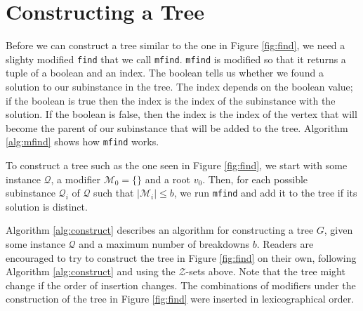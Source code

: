 \section{Constructing a Tree}
\label{sec:construction}
Before we can construct a tree similar to the one in Figure \ref{fig:find},
we need a slighty modified \texttt{find} that we call \texttt{mfind}.
\texttt{mfind} is modified so that it returns a tuple of a boolean and an
index.
The boolean tells us whether we found a solution to our subinstance in the
tree.
The index depends on the boolean value; if the boolean is true then the index
is the index of the subinstance with the solution.
If the boolean is false, then the index is the index of the vertex that will
become the parent of our subinstance that will be added to the tree.
Algorithm \ref{alg:mfind} shows how \texttt{mfind} works.


To construct a tree such as the one seen in Figure \ref{fig:find}, we start
with some instance $\mathcal{Q}$, a modifier $\mathcal{M}_0 = \{ {} \}$ and
a root $v_0$.
Then, for each possible subinstance $\mathcal{Q}_i$ of $\mathcal{Q}$ such that
$|\mathcal{M}_i| \leq b$, we run \texttt{mfind} and add it to the tree if its
solution is distinct.


Algorithm \ref{alg:construct} describes an algorithm for constructing a tree
$G$, given some instance $\mathcal{Q}$ and a maximum number of breakdowns $b$.
Readers are encouraged to try to construct the tree in Figure \ref{fig:find} on
their own, following Algorithm \ref{alg:construct} and using the
$\mathcal{Z}$-sets above. Note that the tree might change if the order of
insertion changes. The combinations of modifiers under the construction of the
tree in Figure \ref{fig:find} were inserted in lexicographical order.
